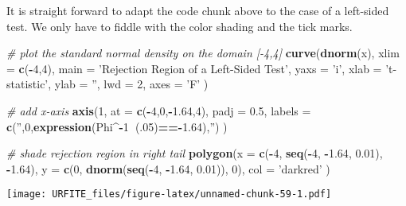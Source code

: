 \documentclass[]{book}
\newenvironment{Shaded}{\begin{snugshade}}{\end{snugshade}}
\newcommand{\KeywordTok}[1]{\textcolor[rgb]{0.13,0.29,0.53}{\textbf{#1}}}
\newcommand{\DataTypeTok}[1]{\textcolor[rgb]{0.13,0.29,0.53}{#1}}
\newcommand{\DecValTok}[1]{\textcolor[rgb]{0.00,0.00,0.81}{#1}}
\newcommand{\FloatTok}[1]{\textcolor[rgb]{0.00,0.00,0.81}{#1}}
\newcommand{\StringTok}[1]{\textcolor[rgb]{0.31,0.60,0.02}{#1}}
\newcommand{\CommentTok}[1]{\textcolor[rgb]{0.56,0.35,0.01}{\textit{#1}}}
\newcommand{\OperatorTok}[1]{\textcolor[rgb]{0.81,0.36,0.00}{\textbf{#1}}}
\newcommand{\NormalTok}[1]{#1}
\theoremstyle{definition}
\theoremstyle{definition}
\theoremstyle{definition}
\theoremstyle{remark}
\begin{document}
It is straight forward to adapt the code chunk above to the case of a
left-sided test. We only have to fiddle with the color shading and the
tick marks.

\begin{Shaded}
\begin{Highlighting}[]
\CommentTok{# plot the standard normal density on the domain [-4,4]}
\KeywordTok{curve}\NormalTok{(}\KeywordTok{dnorm}\NormalTok{(x),}
      \DataTypeTok{xlim =} \KeywordTok{c}\NormalTok{(}\OperatorTok{-}\DecValTok{4}\NormalTok{,}\DecValTok{4}\NormalTok{),}
      \DataTypeTok{main =} \StringTok{'Rejection Region of a Left-Sided Test'}\NormalTok{,}
      \DataTypeTok{yaxs =} \StringTok{'i'}\NormalTok{,}
      \DataTypeTok{xlab =} \StringTok{'t-statistic'}\NormalTok{,}
      \DataTypeTok{ylab =} \StringTok{''}\NormalTok{,}
      \DataTypeTok{lwd =} \DecValTok{2}\NormalTok{,}
      \DataTypeTok{axes =} \StringTok{'F'}
\NormalTok{)}

\CommentTok{# add x-axis}
\KeywordTok{axis}\NormalTok{(}\DecValTok{1}\NormalTok{, }
     \DataTypeTok{at =} \KeywordTok{c}\NormalTok{(}\OperatorTok{-}\DecValTok{4}\NormalTok{,}\DecValTok{0}\NormalTok{,}\OperatorTok{-}\FloatTok{1.64}\NormalTok{,}\DecValTok{4}\NormalTok{), }
     \DataTypeTok{padj =} \FloatTok{0.5}\NormalTok{,}
     \DataTypeTok{labels =} \KeywordTok{c}\NormalTok{(}\StringTok{''}\NormalTok{,}\DecValTok{0}\NormalTok{,}\KeywordTok{expression}\NormalTok{(Phi}\OperatorTok{^-}\DecValTok{1}\OperatorTok{~}\NormalTok{(.}\DecValTok{05}\NormalTok{)}\OperatorTok{==-}\FloatTok{1.64}\NormalTok{),}\StringTok{''}\NormalTok{)}
\NormalTok{)}

\CommentTok{# shade rejection region in right tail}
\KeywordTok{polygon}\NormalTok{(}\DataTypeTok{x =} \KeywordTok{c}\NormalTok{(}\OperatorTok{-}\DecValTok{4}\NormalTok{, }\KeywordTok{seq}\NormalTok{(}\OperatorTok{-}\DecValTok{4}\NormalTok{, }\OperatorTok{-}\FloatTok{1.64}\NormalTok{, }\FloatTok{0.01}\NormalTok{), }\OperatorTok{-}\FloatTok{1.64}\NormalTok{),}
        \DataTypeTok{y =} \KeywordTok{c}\NormalTok{(}\DecValTok{0}\NormalTok{, }\KeywordTok{dnorm}\NormalTok{(}\KeywordTok{seq}\NormalTok{(}\OperatorTok{-}\DecValTok{4}\NormalTok{, }\OperatorTok{-}\FloatTok{1.64}\NormalTok{, }\FloatTok{0.01}\NormalTok{)), }\DecValTok{0}\NormalTok{), }
        \DataTypeTok{col =} \StringTok{'darkred'}
\NormalTok{)}
\end{Highlighting}
\end{Shaded}

\texttt{[image: URFITE\_files/figure-latex/unnamed-chunk-59-1.pdf]}
\end{document}
